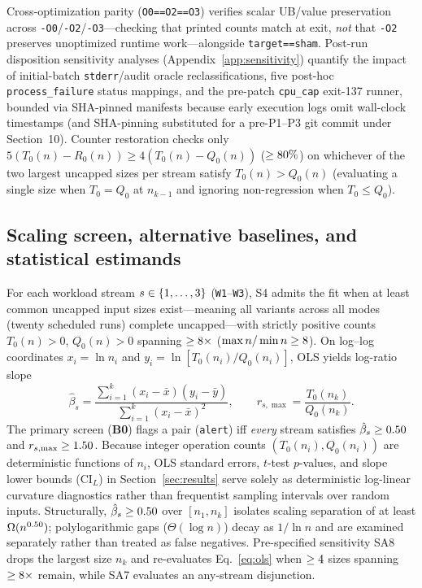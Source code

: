 \documentclass[11pt]{article}
\begin{document}
Cross-optimization parity (\texttt{O0==O2==O3}) verifies scalar UB/value preservation across \texttt{-O0}/\allowbreak\texttt{-O2}/\allowbreak\texttt{-O3}---checking that printed counts match at exit, \emph{not} that \texttt{-O2} preserves unoptimized runtime work---alongside \texttt{target==sham}.
Post-run disposition sensitivity analyses (Appendix~\ref{app:sensitivity}) quantify the impact of \BenchWaveOneOverrideN{} initial-batch \texttt{stderr}/audit oracle reclassifications, five post-hoc \texttt{process\_failure} status mappings, and the pre-patch \texttt{cpu\_cap} exit-137 runner, bounded via SHA-pinned manifests because early execution logs omit wall-clock timestamps (and SHA-pinning substituted for a pre-P1--P3 git commit under Section~10).
Counter restoration checks only $5(T_0(n)-R_0(n)) \ge 4(T_0(n)-Q_0(n))$ ($\ge 80\%{}$) on whichever of the two largest uncapped sizes per stream satisfy $T_0(n) > Q_0(n)$ (evaluating a single size when $T_0 = Q_0$ at $n_{k-1}$ and ignoring non-regression when $T_0 \le Q_0$).

\subsection{Scaling screen, alternative baselines, and statistical estimands}

For each workload stream $s \in \{1,\dots,3{}\}$ (\texttt{W1}--\texttt{W3}), S4 admits the fit when at least \BenchMinSizes{} common uncapped input sizes exist---meaning all \BenchNumVariants{} variants across all \BenchNumModes{} modes (twenty scheduled runs) complete uncapped---with strictly positive counts $T_0(n) > 0$, $Q_0(n) > 0$ spanning $\ge 8{}\times$ ($\max n / \min n \ge 8{}$).
On log--log coordinates $x_i = \ln n_i$ and $y_i = \ln [T_0(n_i)/Q_0(n_i)]$, OLS yields log-ratio slope
\begin{equation}
\hat{\beta}_s = \frac{\sum_{i=1}^{k}(x_i - \bar{x})(y_i - \bar{y})}{\sum_{i=1}^{k}(x_i - \bar{x})^2}, \qquad
r_{s,\max} = \frac{T_0(n_k)}{Q_0(n_k)}.
\label{eq:ols}
\end{equation}
The primary screen (\textbf{B0}) flags a pair (\texttt{alert}) iff \emph{every} stream satisfies $\hat{\beta}_s \ge 0.50{}$ and $r_{s,\max} \ge 1.50{}$.
Because integer operation counts $(T_0(n_i), Q_0(n_i))$ are deterministic functions of $n_i$, OLS standard errors, $t$-test $p$-values, and slope lower bounds ($\text{CI}_L$) in Section~\ref{sec:results} serve solely as deterministic log-linear curvature diagnostics rather than frequentist sampling intervals over random inputs.
Structurally, $\hat{\beta}_s \ge 0.50{}$ over $[n_1, n_k]$ isolates scaling separation of at least $\Omega(n^{0.50{}})$; polylogarithmic gaps ($\Theta(\log n)$) decay as $1/\ln n$ and are examined separately rather than treated as false negatives.
Pre-specified sensitivity SA8 drops the largest size $n_k$ and re-evaluates Eq.~\eqref{eq:ols} when $\ge 4{}$ sizes spanning $\ge 8{}\times$ remain, while SA7 evaluates an any-stream disjunction.
\end{document}
